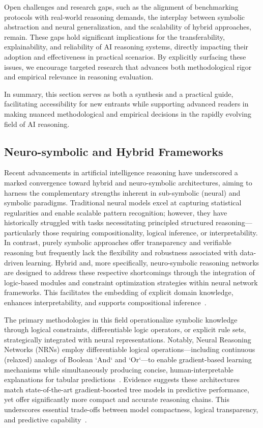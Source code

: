 \documentclass[sigconf]{acmart}
\begin{document}
Open challenges and research gaps, such as the alignment of benchmarking protocols with real-world reasoning demands, the interplay between symbolic abstraction and neural generalization, and the scalability of hybrid approaches, remain. These gaps hold significant implications for the transferability, explainability, and reliability of AI reasoning systems, directly impacting their adoption and effectiveness in practical scenarios. By explicitly surfacing these issues, we encourage targeted research that advances both methodological rigor and empirical relevance in reasoning evaluation.

In summary, this section serves as both a synthesis and a practical guide, facilitating accessibility for new entrants while supporting advanced readers in making nuanced methodological and empirical decisions in the rapidly evolving field of AI reasoning.

\subsection{Neuro-symbolic and Hybrid Frameworks}

Recent advancements in artificial intelligence reasoning have underscored a marked convergence toward hybrid and neuro-symbolic architectures, aiming to harness the complementary strengths inherent in sub-symbolic (neural) and symbolic paradigms. Traditional neural models excel at capturing statistical regularities and enable scalable pattern recognition; however, they have historically struggled with tasks necessitating principled structured reasoning—particularly those requiring compositionality, logical inference, or interpretability. In contrast, purely symbolic approaches offer transparency and verifiable reasoning but frequently lack the flexibility and robustness associated with data-driven learning. Hybrid and, more specifically, neuro-symbolic reasoning networks are designed to address these respective shortcomings through the integration of logic-based modules and constraint optimization strategies within neural network frameworks. This facilitates the embedding of explicit domain knowledge, enhances interpretability, and supports compositional inference~\cite{ref93,ref1,ref10,ref11,ref22,ref42,ref45,ref49,ref54,ref56,ref68,ref86}.

The primary methodologies in this field operationalize symbolic knowledge through logical constraints, differentiable logic operators, or explicit rule sets, strategically integrated with neural representations. Notably, Neural Reasoning Networks (NRNs) employ differentiable logical operations—including continuous (relaxed) analogs of Boolean `And` and `Or`—to enable gradient-based learning mechanisms while simultaneously producing concise, human-interpretable explanations for tabular predictions~\cite{ref93}. Evidence suggests these architectures match state-of-the-art gradient-boosted tree models in predictive performance, yet offer significantly more compact and accurate reasoning chains. This underscores essential trade-offs between model compactness, logical transparency, and predictive capability~\cite{ref93,ref49}.
\end{document}
